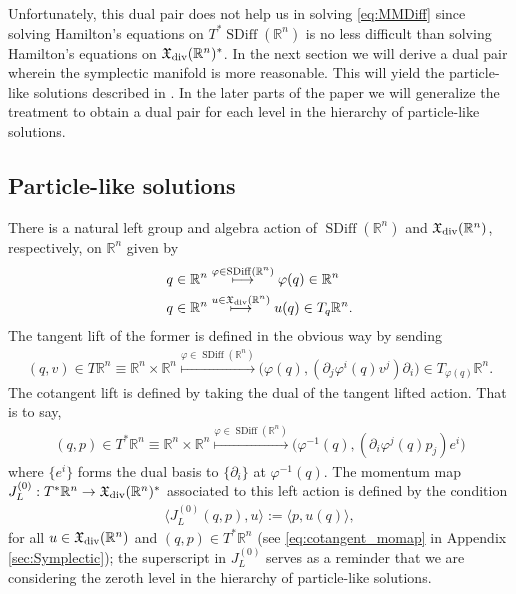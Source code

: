 \documentclass[12pt]{amsart}
\newcommand{\R}{\ensuremath{\mathbb{R}}}
\DeclareMathOperator{\SDiff}{SDiff}
\begin{document}
Unfortunately, this dual pair does not help us in solving \eqref{eq:MMDiff}
since solving Hamilton's equations on $T^*\SDiff(\R^n)$ is no less difficult
than solving Hamilton's equations on $\mathfrak{X}_{\rm div}(\R^n)^*$.
In the next section we will derive a dual pair wherein the symplectic
manifold is more reasonable.
This will yield the particle-like solutions described in \cite{MumfordMichor2013}. In the later parts of the paper we will generalize the treatment to obtain a  dual pair for each level in the hierarchy of particle-like solutions.

\subsection{Particle-like solutions}
\label{sec:Momentum maps}
There is a natural left group and algebra action of $\SDiff(\R^n)$
and $\mathfrak{X}_{\rm div}(\R^n)$, respectively, on $\R^n$ given by
\begin{align*}
  q \in \R^n
  &\stackrel{ \varphi \in \SDiff(\R^n) }{\longmapsto}
  \varphi(q) \in \R^n \\
  q \in \R^n
  &\stackrel{ u \in \mathfrak{X}_{\rm div}(\R^n) }{\longmapsto}
  u(q) \in T_q\R^n.
\end{align*}
The tangent lift of the former is defined in the obvious way by sending
\begin{align*}
  (q,v) \in T\R^n \equiv \R^n \times \R^n
  \stackrel{ \varphi \in \SDiff(\R^n) }{\longmapsto}
  \big(\varphi(q) , (\partial_j\varphi^i(q) v^j) \partial_i \big) \in T_{\varphi(q)} \R^n.
\end{align*}
The cotangent lift is defined by taking the dual
of  the tangent lifted action.
That is to say,
\begin{align*}
  (q, p) \in T^*\R^n \equiv \R^n \times \R^n
  \stackrel{ \varphi \in \SDiff(\R^n) }{\longmapsto}
  \big(\varphi^{-1}(q) , (\partial_i\varphi^j(q) p_j) e^i \big)
\end{align*}
where $\{e^i\}$ forms the dual basis to $\{\partial_i\}$ at $\varphi^{-1}(q)$.
The momentum map
$J^{(0)}_L : T^*\R^n \to \mathfrak{X}_{\rm div}(\R^n)^*$
associated to this left action is defined by the
condition
\begin{align*}
  \langle J_L^{(0)}( q , p) , u \rangle := \langle p , u(q) \rangle,
\end{align*}
for all $u \in \mathfrak{X}_{\rm div}(\R^n)$ and $(q,p) \in T^*\R^n$ (see \eqref{eq:cotangent_momap} in Appendix \ref{sec:Symplectic}); the superscript in $J_L^{(0)}$ serves as a reminder that we are considering the zeroth level in the hierarchy of particle-like solutions.
\end{document}
